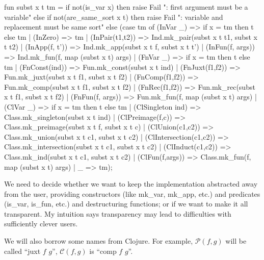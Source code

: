 \nwenddocs{}\endmoddef\nwstartdeflinemarkup\nwenddeflinemarkup
{}\nwendcode{}\nwdocspar

\nwenddocs{}\endmoddef\nwstartdeflinemarkup\nwenddeflinemarkup
fun subst x t tm =
  if not(is_var x)
  then raise Fail ": first argument must be a variable"
  else if not(are_same_sort x t)
  then raise Fail ": variable and replacement must be same sort"
  else (case tm of
   (InVar _) => if x = tm then t else tm
 | (InZero) => tm
 | (InPair(t1,t2)) => Ind.mk_pair(subst x t t1, subst x t t2)
 | (InApp(f, t')) => Ind.mk_app(subst x t f, subst x t t')
 | (InFun(f, args)) => Ind.mk_fun(f, map (subst x t) args)
 | (FnVar _) => if x = tm then t else tm
 | (FnConst(ind)) => Fun.mk_const(subst x t ind)
 | (FnJuxt(f1,f2)) => Fun.mk_juxt(subst x t f1, subst x t f2)
 | (FnComp(f1,f2)) => Fun.mk_comp(subst x t f1, subst x t f2)
 | (FnRec(f1,f2)) => Fun.mk_rec(subst x t f1, subst x t f2)
 | (FnFun(f, args)) => Fun.mk_fun(f, map (subst x t) args)
 | (ClVar _) => if x = tm then t else tm
 | (ClSingleton ind) => Class.mk_singleton(subst x t ind)
 | (ClPreimage(f,c)) => Class.mk_preimage(subst x t f, subst x t c)
 | (ClUnion(c1,c2)) => Class.mk_union(subst x t c1, subst x t c2)
 | (ClIntersection(c1,c2)) => Class.mk_intersection(subst x t c1, subst x t c2)
 | (ClInduct(c1,c2)) => Class.mk_ind(subst x t c1, subst x t c2)
 | (ClFun(f,args)) => Class.mk_fun(f, map (subst x t) args)
 | _ => tm);
\nwendcode{}\nwdocspar

\begin{node}
We need to decide whether we want to keep the implementation
abstracted away from the user, providing constructors (like
{\Tt{}mk{\_}var\nwendquote}, {\Tt{}mk{\_}app\nwendquote}, etc.) and predicates ({\Tt{}is{\_}var\nwendquote}, {\Tt{}is{\_}fun\nwendquote}, etc.)
and destructuring functions; or if we want to make it all transparent. 
My intuition says transparency may lead to difficulties with
sufficiently clever users.

We will also borrow some names from Clojure. For example,
$\mathcal{P}(f,g)$ will be called ``juxt $f$ $g$'', $\mathcal{C}(f,g)$
is ``comp $f$ $g$''.
\end{node}


